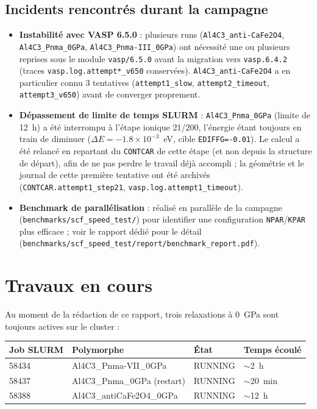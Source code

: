 \documentclass[11pt,a4paper]{article}
\begin{document}
\subsection{Incidents rencontrés durant la campagne}
\label{sec:incidents}

\begin{itemize}
  \item \textbf{Instabilité avec VASP 6.5.0} : plusieurs runs (\texttt{Al4C3\_anti-CaFe2O4},
  \texttt{Al4C3\_Pnma\_0GPa}, \texttt{Al4C3\_Pnma-III\_0GPa}) ont nécessité une ou plusieurs
  reprises sous le module \texttt{vasp/6.5.0} avant la migration vers \texttt{vasp.6.4.2}
  (traces \texttt{vasp.log.attempt*\_v650} conservées). \texttt{Al4C3\_anti-CaFe2O4} a en
  particulier connu 3 tentatives (\texttt{attempt1\_slow}, \texttt{attempt2\_timeout},
  \texttt{attempt3\_v650}) avant de converger proprement.
  \item \textbf{Dépassement de limite de temps SLURM} : \texttt{Al4C3\_Pnma\_0GPa} (limite de
  12~h) a été interrompu à l'étape ionique 21/200, l'énergie étant toujours en train de
  diminuer ($\Delta E = -1.8\times10^{-3}$~eV, cible \texttt{EDIFFG=-0.01}). Le calcul a été
  relancé en repartant du \texttt{CONTCAR} de cette étape (et non depuis la structure de
  départ), afin de ne pas perdre le travail déjà accompli ; la géométrie et le journal de
  cette première tentative ont été archivés
  (\texttt{CONTCAR.attempt1\_step21}, \texttt{vasp.log.attempt1\_timeout}).
  \item \textbf{Benchmark de parallélisation} : réalisé en parallèle de la campagne
  (\texttt{benchmarks/scf\_speed\_test/}) pour identifier une configuration
  \texttt{NPAR}/\texttt{KPAR} plus efficace ; voir le rapport dédié pour le détail
  (\texttt{benchmarks/scf\_speed\_test/report/benchmark\_report.pdf}).
\end{itemize}

\section{Travaux en cours}

Au moment de la rédaction de ce rapport, trois relaxations à 0~GPa sont toujours actives sur
le cluster :

\begin{center}
\begin{tabular}{llll}
\toprule
Job SLURM & Polymorphe & État & Temps écoulé \\
\midrule
58434 & Al4C3\_Pnma-VII\_0GPa      & RUNNING & $\sim$2~h \\
58437 & Al4C3\_Pnma\_0GPa (restart) & RUNNING & $\sim$20~min \\
58388 & Al4C3\_antiCaFe2O4\_0GPa    & RUNNING & $\sim$12~h \\
\bottomrule
\end{tabular}
\end{center}
\end{document}
